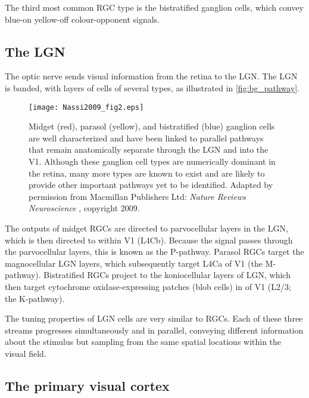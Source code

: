 The third most common \ac{RGC} type is the bistratified ganglion cells, which convey blue-on yellow-off colour-opponent signals.



\subsection{The \acl{LGN}}

The optic nerve sends visual information from the retina to the \acf{LGN}.
The \ac{LGN} is banded, with layers of cells of several types, as illustrated in \autoref{fig:bg_pathway}.

\begin{figure}[htb]
\centering
\texttt{[image: Nassi2009\_fig2.eps]}
\caption{
Midget (red), parasol (yellow), and bistratified (blue) ganglion cells are well characterized and have been linked to parallel pathways that remain anatomically separate through the \ac{LGN} and into the \ac{V1}.
Although these ganglion cell types are numerically dominant in the retina, many more types are known to exist and are likely to provide other important pathways yet to be identified.
Adapted by permission from Macmillan Publishers Ltd: \textit{Nature Reviews Neuroscience} \citep{Nassi2009}, copyright 2009.
}
\label{fig:bg_pathway}
\end{figure}

The outputs of midget \acp{RGC} are directed to parvocellular layers in the \ac{LGN}, which is then directed to  within \ac{V1} (\acs{L4Cb}).
Because the signal passes through the parvocellular layers, this is known as the P-pathway.
Parasol \acp{RGC} target the magnocellular \ac{LGN} layers, which subsequently target \acs{L4Ca} of \ac{V1} (the M-pathway).
Bistratified \acp{RGC} project to the koniocellular layers of \ac{LGN}, which then target cytochrome oxidase-expressing patches (blob cells) in  of \ac{V1} (\acs{L2/3}; the K-pathway).

The tuning properties of \ac{LGN} cells are very similar to \acp{RGC}.
Each of these three streams progresses simultaneously and in parallel, conveying different information about the stimulus but sampling from the same spatial locations within the visual field.


\subsection{The primary visual cortex}
\label{sec:bg_v1}

